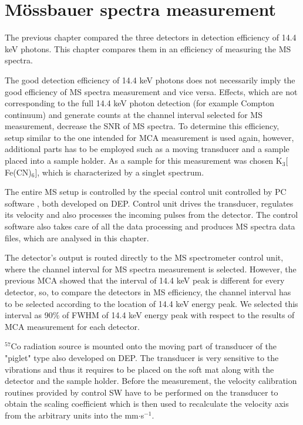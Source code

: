 \chapter{Mössbauer spectra measurement}
The previous chapter compared the three detectors in detection efficiency of 14.4 keV photons. This chapter compares them in an efficiency of measuring the MS spectra.
\par
The good detection efficiency of 14.4 keV photons does not necessarily imply the good efficiency of MS spectra measurement and vice versa. Effects, which are not corresponding to the full 14.4 keV photon detection (for example Compton continuum) and generate counts at the channel interval selected for MS measurement, decrease the SNR of MS spectra. To determine this efficiency, setup similar to the one intended for MCA measurement is used again, however, additional parts has to be employed such as a moving transducer and a sample placed into a sample holder. As a sample for this measurement was chosen K$_{3}[$Fe(CN)$_{6}]$, which is characterized by a singlet spectrum.
\par
The entire MS setup is controlled by the special control unit controlled by PC software \cite{STEJSKAL2019thesis}, both developed on DEP. Control unit drives the transducer, regulates its velocity and also processes the incoming pulses from the detector. The control software also takes care of all the data processing and produces MS spectra data files, which are analysed in this chapter.

\par
The detector's output is routed directly to the MS spectrometer control unit, where the channel interval for MS spectra measurement is selected. However, the previous MCA showed that the interval of 14.4 keV peak is different for every detector, so, to compare the detectors in MS efficiency, the channel interval  has to be selected according to the location of 14.4 keV energy peak. We selected this interval as 90$\%$ of FWHM of 14.4 keV energy peak with respect to the results of MCA measurement for each detector.
\par
$^{57}$Co radiation source is mounted onto the moving part of transducer of the "piglet" type also developed on DEP. The transducer is very sensitive to the vibrations and thus it requires to be placed on the soft mat along with the detector and the sample holder. Before the measurement, the velocity calibration routines provided by control SW have to be performed on the transducer to obtain the scaling coefficient which is then used to recalculate the velocity axis from the arbitrary units into the mm$\cdot$s$^{-1}$. 

